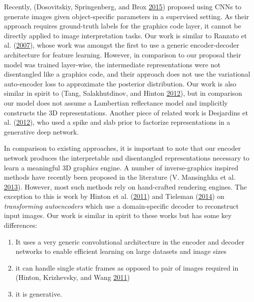\documentclass[12pt,twoside]{mitthesis}
\providecommand{\tightlist}{%
  \setlength{\itemsep}{0pt}\setlength{\parskip}{0pt}}
\begin{document}
Recently, (Dosovitskiy, Springenberg, and Brox
\protect\hyperlink{ref-dosovitskiy2015learning}{2015}) proposed using
CNNs to generate images given object-specific parameters in a supervised
setting. As their approach requires ground-truth labels for the graphics
code layer, it cannot be directly applied to image interpretation tasks.
Our work is similar to Ranzato et al.
(\protect\hyperlink{ref-ranzato2007unsupervised}{2007}), whose work was
amongst the first to use a generic encoder-decoder architecture for
feature learning. However, in comparison to our proposal their model was
trained layer-wise, the intermediate representations were not
disentangled like a graphics code, and their approach does not use the
variational auto-encoder loss to approximate the posterior distribution.
Our work is also similar in spirit to (Tang, Salakhutdinov, and Hinton
\protect\hyperlink{ref-tang2012deep}{2012}), but in comparison our model
does not assume a Lambertian reflectance model and implicitly constructs
the 3D representations. Another piece of related work is Desjardins et
al. (\protect\hyperlink{ref-desjardins2012disentangling}{2012}), who
used a spike and slab prior to factorize representations in a generative
deep network.

In comparison to existing approaches, it is important to note that our
encoder network produces the interpretable and disentangled
representations necessary to learn a meaningful 3D graphics engine. A
number of inverse-graphics inspired methods have recently been proposed
in the literature (V. Mansinghka et al.
\protect\hyperlink{ref-mansinghka2013approximate}{2013}). However, most
such methods rely on hand-crafted rendering engines. The exception to
this is work by Hinton et al.
(\protect\hyperlink{ref-hinton2011transforming}{2011}) and Tieleman
(\protect\hyperlink{ref-tieleman2014optimizing}{2014}) on
\emph{transforming autoencoders} which use a domain-specific decoder to
reconstruct input images. Our work is similar in spirit to these works
but has some key differences:

\begin{enumerate}
\def\labelenumi{\alph{enumi})}
\tightlist
\item
  It uses a very generic convolutional architecture in the encoder and
  decoder networks to enable efficient learning on large datasets and
  image sizes
\item
  it can handle single static frames as opposed to pair of images
  required in (Hinton, Krizhevsky, and Wang
  \protect\hyperlink{ref-hinton2011transforming}{2011})
\item
  it is generative.
\end{enumerate}
\end{document}
